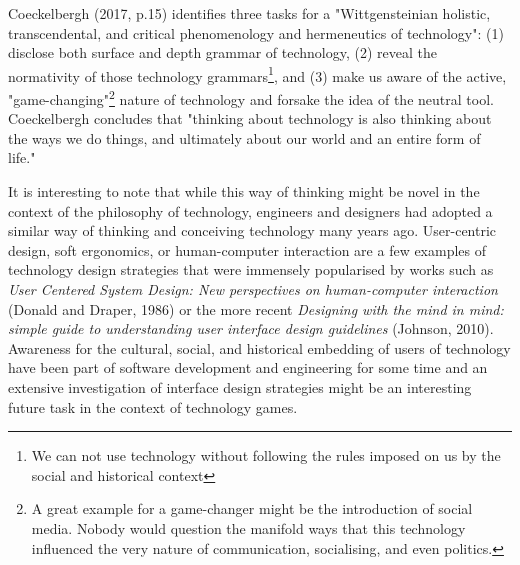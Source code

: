 Coeckelbergh (2017, p.15) identifies three tasks for a "Wittgensteinian holistic, transcendental, and critical phenomenology and hermeneutics of technology": (1) disclose both surface and depth grammar of technology, (2) reveal the normativity of those technology grammars\footnote{We can not use technology without following the rules imposed on us by the social and historical context}, and (3) make us aware of the active, "game-changing"\footnote{A great example for a game-changer might be the introduction of social media. Nobody would question the manifold ways that this technology influenced the very nature of communication, socialising, and even politics.} nature of technology and forsake the idea of the neutral tool. Coeckelbergh concludes that "thinking about technology is also thinking about the
ways we do things, and ultimately about our world and an entire form of life."

It is interesting to note that while this way of thinking might be novel in the context of the philosophy of technology, engineers and designers had adopted a similar way of thinking and conceiving technology many years ago. User-centric design, soft ergonomics, or human-computer interaction are a few examples of technology design
strategies that were immensely popularised by works such as \textit{User Centered System Design: New perspectives on human-computer interaction} (Donald and Draper, 1986) or the more recent \textit{Designing with the mind in mind: simple guide to understanding user interface design guidelines} (Johnson, 2010). Awareness for the cultural, social, and historical embedding of users of technology have been part of software development and engineering for some time and an extensive investigation of interface design strategies might be an interesting future task in the context of technology games.